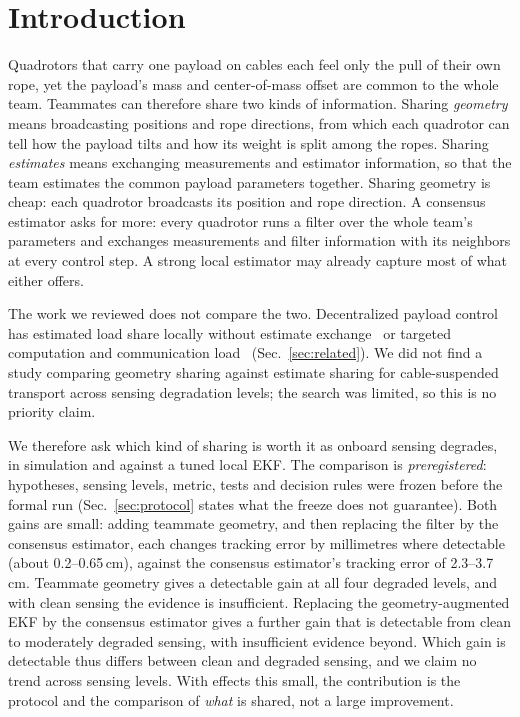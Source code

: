 \documentclass[conference]{IEEEtran}
\begin{document}
\section{Introduction}
Quadrotors that carry one payload on cables each feel only the pull of their own rope, yet the payload's mass and center-of-mass offset are common to the whole team. Teammates can therefore share two kinds of information. Sharing \emph{geometry} means broadcasting positions and rope directions, from which each quadrotor can tell how the payload tilts and how its weight is split among the ropes. Sharing \emph{estimates} means exchanging measurements and estimator information, so that the team estimates the common payload parameters together. Sharing geometry is cheap: each quadrotor broadcasts its position and rope direction. A consensus estimator asks for more: every quadrotor runs a filter over the whole team's parameters and exchanges measurements and filter information with its neighbors at every control step. A strong local estimator may already capture most of what either offers.

The work we reviewed does not compare the two. Decentralized payload control has estimated load share locally without estimate exchange~\cite{gpac2026} or targeted computation and communication load~\cite{tasooji2025} (Sec.~\ref{sec:related}). We did not find a study comparing geometry sharing against estimate sharing for cable-suspended transport across sensing degradation levels; the search was limited, so this is no priority claim.

We therefore ask which kind of sharing is worth it as onboard sensing degrades, in simulation and against a tuned local EKF. The comparison is \emph{preregistered}: hypotheses, sensing levels, metric, tests and decision rules were frozen before the formal run (Sec.~\ref{sec:protocol} states what the freeze does not guarantee). Both gains are small: adding teammate geometry, and then replacing the filter by the consensus estimator, each changes tracking error by millimetres where detectable (about 0.2--0.65\,cm), against the consensus estimator's tracking error of 2.3--3.7\,cm. Teammate geometry gives a detectable gain at all four degraded levels, and with clean sensing the evidence is insufficient. Replacing the geometry-augmented EKF by the consensus estimator gives a further gain that is detectable from clean to moderately degraded sensing, with insufficient evidence beyond. Which gain is detectable thus differs between clean and degraded sensing, and we claim no trend across sensing levels. With effects this small, the contribution is the protocol and the comparison of \emph{what} is shared, not a large improvement.
\end{document}

